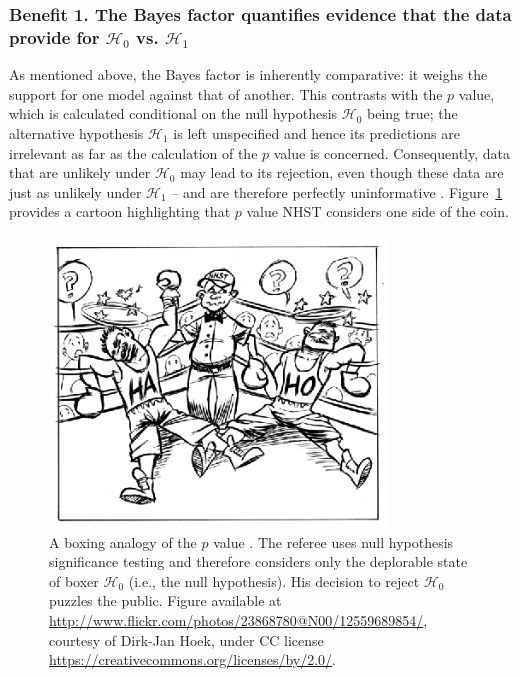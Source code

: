\subsubsection{Benefit 1. The Bayes factor quantifies evidence that the data provide for $\mathcal{H}_0$ vs. $\mathcal{H}_1$}
As mentioned above, the Bayes factor is inherently comparative: it weighs the support for one model against that of another. This contrasts with the $p$ value, which is calculated conditional on the null hypothesis $\mathcal{H}_0$ being true; the alternative hypothesis $\mathcal{H}_1$ is left unspecified and hence its predictions are irrelevant as far as the calculation of the $p$ value is concerned. Consequently, data that are unlikely under $\mathcal{H}_0$ may lead to its rejection, even though these data are just as unlikely under $\mathcal{H}_1$ -- and are therefore perfectly uninformative \cite{WagenmakersEtAlScrutinyBookinpress}. Figure~\ref{fig:bi1:Boxers} provides a cartoon highlighting that $p$ value NHST considers one side of the coin.

\begin{figure}[!t]
    \begin{center}
        \includegraphics[width=0.8\textwidth]{figs/bi1_BoxersLowRes.eps}
        \caption{A boxing analogy of the $p$ value \protect\cite{WagenmakersEtAlScrutinyBookinpress}. The referee uses null hypothesis significance testing and therefore considers only the deplorable state of boxer $\mathcal{H}_0$ (i.e., the null hypothesis). His decision to reject $\mathcal{H}_0$ puzzles the public. Figure available at \protect\url{http://www.flickr.com/photos/23868780@N00/12559689854/}, courtesy of Dirk-Jan Hoek, under CC license \protect\url{https://creativecommons.org/licenses/by/2.0/}.}\label{fig:bi1:Boxers}
    \end{center}
\end{figure}

